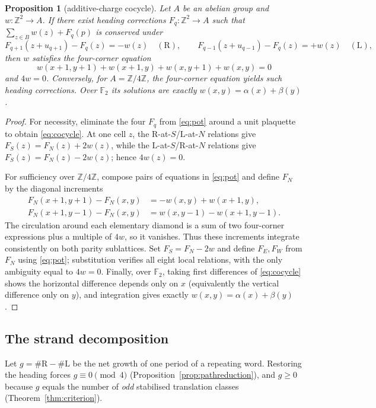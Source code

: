 \documentclass[11pt,reqno]{amsart}
\theoremstyle{plain}
\newtheorem{proposition}[theorem]{Proposition}
\theoremstyle{definition}
\newcommand{\Z}{\mathbb{Z}}
\newcommand{\F}{\mathbb{F}}
\newcommand{\growth}{g}
\newcommand{\turnR}{\mathrm{R}}
\newcommand{\turnL}{\mathrm{L}}
\begin{document}
\begin{proposition}[additive-charge cocycle]\label{prop:cocycle}
Let $A$ be an abelian group and $w:\Z^2\to A$. If there exist heading corrections
$F_q:\Z^2\to A$ such that $\sum_{z\in B}w(z)+F_q(p)$ is conserved under
\begin{equation}\label{eq:pot}
F_{q+1}(z+u_{q+1})-F_q(z)=-w(z)\quad(\turnR),\qquad
F_{q-1}(z+u_{q-1})-F_q(z)=+w(z)\quad(\turnL),
\end{equation}
then $w$ satisfies the four-corner equation
\begin{equation}\label{eq:cocycle}
w(x{+}1,y{+}1)+w(x{+}1,y)+w(x,y{+}1)+w(x,y)=0
\end{equation}
and $4w=0$. Conversely, for $A=\Z/4\Z$, the four-corner equation yields such
heading corrections. Over $\F_2$ its solutions are exactly
$w(x,y)=\alpha(x)+\beta(y)$.
\end{proposition}

\begin{proof}
For necessity, eliminate the four $F_q$ from \eqref{eq:pot} around a unit
plaquette to obtain \eqref{eq:cocycle}. At one cell $z$, the
$\turnR$-at-$S$/$\turnL$-at-$N$ relations give $F_S(z)=F_N(z)+2w(z)$, while the
$\turnL$-at-$S$/$\turnR$-at-$N$ relations give $F_S(z)=F_N(z)-2w(z)$; hence
$4w(z)=0$.

For sufficiency over $\Z/4\Z$, compose pairs of equations in \eqref{eq:pot} and
define $F_N$ by the diagonal increments
\begin{align*}
F_N(x{+}1,y{+}1)-F_N(x,y)&=-w(x,y)+w(x{+}1,y),\\
F_N(x{+}1,y{-}1)-F_N(x,y)&=w(x,y{-}1)-w(x{+}1,y{-}1).
\end{align*}
The circulation around each elementary diamond is a sum of two four-corner
expressions plus a multiple of $4w$, so it vanishes. Thus these increments
integrate consistently on both parity sublattices. Set $F_S=F_N-2w$ and define
$F_E,F_W$ from $F_N$ using \eqref{eq:pot}; substitution verifies all eight local
relations, with the only ambiguity equal to $4w=0$. Finally, over $\F_2$, taking
first differences of \eqref{eq:cocycle} shows the horizontal difference depends
only on $x$ (equivalently the vertical difference only on $y$), and integration
gives exactly $w(x,y)=\alpha(x)+\beta(y)$.
\end{proof}

\subsection{The strand decomposition}
Let $\growth=\#\turnR-\#\turnL$ be the net growth of one period of a repeating
word. Restoring the heading forces $\growth\equiv0\pmod4$
(Proposition~\ref{prop:pathreduction}), and $\growth\ge0$ because $\growth$
equals the number of \emph{odd} stabilised translation classes
(Theorem~\ref{thm:criterion}).
\end{document}
